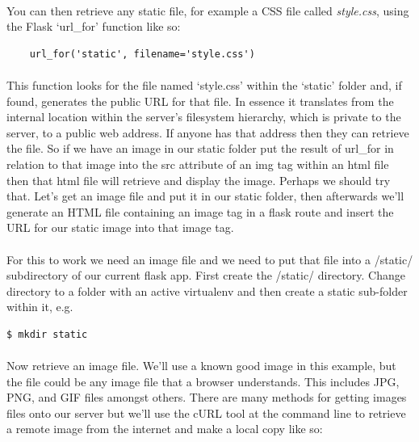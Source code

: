 \documentclass[12pt, a4paper, oneside]{book}
\begin{document}
\paragraph{} You can then retrieve any static file, for example a CSS file called \emph{style.css}, using the Flask `url\_for' function like so:

\begin{lstlisting}
    url_for('static', filename='style.css')
\end{lstlisting}

\paragraph{} This function looks for the file named `style.css' within the `static' folder and, if found, generates the public URL for that file. In essence it translates from the internal location within the server's filesystem hierarchy, which is private to the server, to a public web address. If anyone has that address then they can retrieve the file. So if we have an image in our static folder put the result of url\_for in relation to that image into the src attribute of an img tag within an html file then that html file will retrieve and display the image. Perhaps we should try that. Let's get an image file and put it in our static folder, then afterwards we'll generate an HTML file containing an image tag in a flask route and insert the URL for our static image into that image tag.

\paragraph{} For this to work we need an image file and we need to put that file into a /static/ subdirectory of our current flask app. First create the /static/ directory. Change directory to a folder with an active virtualenv and then create a static sub-folder within it, e.g.

\begin{lstlisting}[style=DOS]
    $ mkdir static 
\end{lstlisting}

\paragraph{} Now retrieve an image file. We'll use a known good image in this example, but the file could be any image file that a browser understands. This includes JPG, PNG, and GIF files amongst others. There are many methods for getting images files onto our server but we'll use the cURL tool at the command line to retrieve a remote image from the internet and make a local copy like so:
\end{document}
